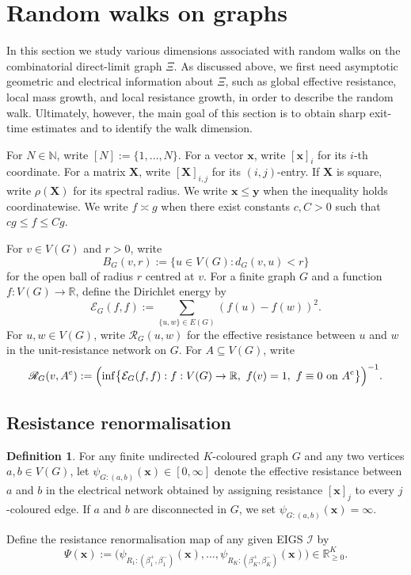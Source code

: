 \documentclass{article}
\theoremstyle{plain}
\theoremstyle{definition}
\newtheorem{definition}[theorem]{Definition}
\newcommand{\Reff}{\mathscr{R}}
\begin{document}
\section{Random walks on graphs}\label{sec:random_walks}

In this section we study various dimensions associated with random walks on the combinatorial direct-limit graph $\Xi$.
As discussed above, we first need asymptotic geometric and electrical information about $\Xi$, such as global effective resistance, local mass growth, and local resistance growth, in order to describe the random walk.
Ultimately, however, the main goal of this section is to obtain sharp exit-time estimates and to identify the walk dimension.

For $N\in\mathbb N$, write $[N]:=\{1,\dots,N\}$.
For a vector $\mathbf x$, write $[\mathbf x]_i$ for its $i$-th coordinate.
For a matrix $\mathbf X$, write $[\mathbf X]_{i,j}$ for its $(i,j)$-entry.
If $\mathbf X$ is square, write $\rho(\mathbf X)$ for its spectral radius.
We write $\mathbf x\le \mathbf y$ when the inequality holds coordinatewise.
We write $f\asymp g$ when there exist constants $c,C>0$ such that $cg\le f\le Cg$.

For $v\in V(G)$ and $r>0$, write
\[
B_G(v,r):=\{u\in V(G): d_G(v,u)<r\}
\]
for the open ball of radius $r$ centred at $v$.
For a finite graph $G$ and a function $f:V(G)\to\mathbb R$, define the Dirichlet energy by
\[
\mathcal E_G(f,f):=\sum_{\{u,w\}\in E(G)} (f(u)-f(w))^2.
\]
For $u,w\in V(G)$, write $\Reff_G(u,w)$ for the effective resistance between $u$ and $w$ in the unit-resistance network on $G$.
For $A\subseteq V(G)$, write
\[
\Reff_G(v,A^{\mathrm c})
:=
\Bigl(
\inf\bigl\{
\mathcal E_G(f,f): f:V(G)\to\mathbb R,\ f(v)=1,\ f\equiv 0 \text{ on } A^{\mathrm c}
\bigr\}
\Bigr)^{-1}.
\]

\subsection{Resistance renormalisation}\label{subsec:resistance}

\begin{definition}\label{def:psi_Psi}
For any finite undirected $K$-coloured graph $G$ and any two vertices $a,b\in V(G)$,
let $\psi_{G:(a,b)}(\mathbf x)\in[0,\infty]$ denote the effective resistance between $a$ and $b$
in the electrical network obtained by assigning resistance $[\mathbf x]_j$ to every $j$-coloured edge.
If $a$ and $b$ are disconnected in $G$, we set $\psi_{G:(a,b)}(\mathbf x)=\infty$.

Define the resistance renormalisation map of any given EIGS $\mathscr I$ by
\[
\Psi(\mathbf x):=\big(\psi_{R_1:(\beta_1^+,\beta_1^-)}(\mathbf x),\dots,
\psi_{R_K:(\beta_K^+,\beta_K^-)}(\mathbf x)\big)\in\mathbb R_{\ge 0}^K.
\]
\end{definition}
\end{document}
